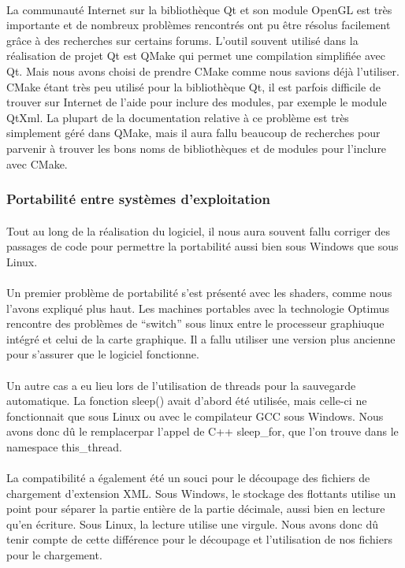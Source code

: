 \paragraph{}
La communauté Internet sur la bibliothèque Qt et son module OpenGL est très importante et de nombreux problèmes rencontrés ont pu être résolus facilement grâce à des recherches sur certains forums. 
L'outil souvent utilisé dans la réalisation de projet Qt est QMake qui permet une compilation simplifiée avec Qt. Mais nous avons choisi de prendre CMake comme nous savions déjà l'utiliser.
CMake étant très peu utilisé pour la bibliothèque Qt, il est parfois difficile de trouver sur Internet de l'aide pour inclure des modules, par exemple le module QtXml. La plupart de la documentation relative à ce problème est très simplement géré dans QMake, mais il aura fallu beaucoup de recherches pour parvenir à trouver les bons noms de bibliothèques et de modules pour l'inclure avec CMake.

\subsubsection{Portabilité entre systèmes d'exploitation}
\paragraph{}
Tout au long de la réalisation du logiciel, il nous aura souvent fallu corriger des passages de code pour permettre la portabilité aussi bien sous Windows que sous Linux. 
\paragraph{}
Un premier problème de portabilité s'est présenté avec les shaders, comme nous l'avons expliqué plus haut. Les machines portables avec la technologie Optimus rencontre des problèmes de ``switch'' sous linux entre le processeur graphiuque intégré et celui de la carte graphique. Il a fallu utiliser une version plus ancienne pour s'assurer que le logiciel fonctionne.

\paragraph{}
Un autre cas a eu lieu lors de l'utilisation de threads pour la sauvegarde automatique. La fonction sleep() avait d'abord été utilisée, mais celle-ci ne fonctionnait que sous Linux ou avec le compilateur GCC sous Windows. Nous avons donc dû le remplacerpar l'appel de C++ sleep\_for, que l'on trouve dans le namespace this\_thread. 

\paragraph{}
La compatibilité a également été un souci pour le découpage des fichiers de chargement d'extension XML. Sous Windows, le stockage des flottants utilise un point pour séparer la partie entière de la partie décimale, aussi bien en lecture qu'en écriture. Sous Linux, la lecture utilise une virgule. Nous avons donc dû tenir compte de cette différence pour le découpage et l'utilisation de nos fichiers pour le chargement.
